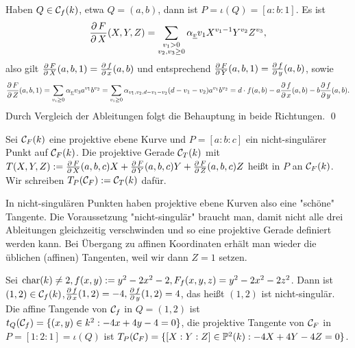 	Haben $Q \in \mathcal{C}_f(k)$, etwa $Q = (a,b)$, dann ist $P = \iota(Q) = [a:b:1]$. Es ist
	\[ \frac{\der F}{\der X}(X,Y,Z) = \sum_{\substack{v_1 > 0 \\ v_2, v_3 \geq 0}} \alpha_{\uline{v}} v_1 X^{v_1-1} Y^{v_2} Z^{v_3}, \]
	also gilt $\frac{\operatorname{\partial} F}{\operatorname{\partial} X}(a,b,1) = \frac{\operatorname{\partial} f}{\operatorname{\partial} x}(a,b)$ und entsprechend $\frac{\operatorname{\partial} F}{\operatorname{\partial} Y}(a,b,1) = \frac{\operatorname{\partial} f}{\operatorname{\partial} y}(a,b)$, sowie
	\[ \frac{\der F}{\der Z}(a,b,1) = \sum_{v_i \geq 0} \alpha_{\uline{v}} v_3 a^{v_1} b^{v_2} = \sum_{v_i \geq 0} \alpha_{v_1,v_2,d-v_1-v_2} (d-v_1-v_2) a^{v_1} b^{v_2} = d \cdot f(a,b) - a\frac{\der f}{\der x}(a,b) - b \frac{\der f}{\der y}(a,b). \]
	Durch Vergleich der Ableitungen folgt die Behauptung in beide Richtungen. \qed
	
\begin{defn}[Tangente]
	Sei $\mathcal{C}_F(k)$ eine projektive ebene Kurve und $P = [a:b:c]$ ein nicht-singulärer Punkt auf $\mathcal{C}_F(k)$. Die projektive Gerade $\mathcal{C}_T(k)$ mit $T(X,Y,Z) := \frac{\operatorname{\partial} F}{\operatorname{\partial} X}(a,b,c)X  + \frac{\operatorname{\partial} F}{\operatorname{\partial} Y}(a,b,c)Y + \frac{\operatorname{\partial} F}{\operatorname{\partial} Z}(a,b,c)Z$ heißt  in $P$ an $\mathcal{C}_F(k)$. Wir schreiben $T_P(\mathcal{C}_F) := \mathcal{C}_T(k)$ dafür.
\end{defn}

\begin{bem}
	In nicht-singulären Punkten haben projektive ebene Kurven also eine "schöne" Tangente. Die Voraussetzung "nicht-singulär" braucht man, damit nicht alle drei Ableitungen gleichzeitig verschwinden und so eine projektive Gerade definiert werden kann. Bei Übergang zu affinen Koordinaten erhält man wieder die üblichen (affinen) Tangenten, weil wir dann $Z = 1$ setzen.
\end{bem}

\begin{bsp}
	Sei $\operatorname{char}(k) \neq 2, f(x,y) := y^2 - 2x^2 - 2, F_f(x,y,z) = y^2-2x^2-2z^2$. Dann ist $(1,2) \in \mathcal{C}_f(k)$,\linebreak $\frac{\operatorname{\partial} f}{\operatorname{\partial} x}(1,2) = -4, \frac{\operatorname{\partial} f}{\operatorname{\partial} y}(1,2) = 4$, das heißt $(1,2)$ ist nicht-singulär. Die affine Tangende von $\mathcal{C}_f$ in $Q = (1,2)$ ist $t_Q(\mathcal{C}_f) = \{(x,y) \in k^2 : -4x + 4y - 4 = 0\}$, die projektive Tangente von $\mathcal{C}_F$ in $P = [1:2:1] = \iota(Q)$ ist $T_P(\mathcal{C}_F) = \{[X:Y:Z] \in \mathbb{P}^2(k) : -4X + 4Y - 4Z = 0\}$.
\end{bsp}

